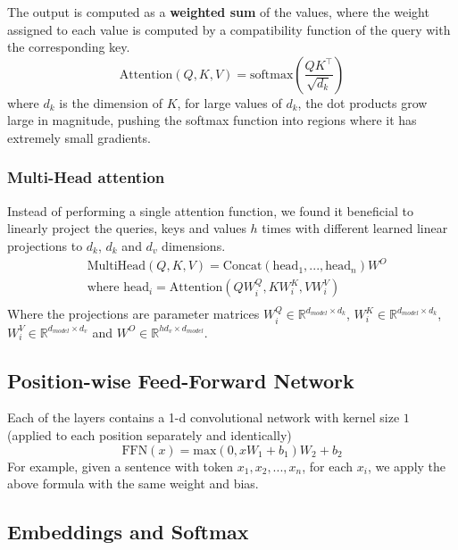 \documentclass[a3paper, 12pt]{book} %
\begin{document}
The output is computed as a \textbf{weighted sum} of the values, where the weight assigned to each value is computed by a compatibility function of the query with the corresponding key.
\begin{equation}
\text{Attention}{(Q,K,V)}= \text{softmax}{(\frac{QK^{\top}}{\sqrt{d_k}})}
\end{equation}
where $d_k$ is the dimension of $K$, for large values of $d_k$, the dot products grow large in magnitude, pushing the softmax function into regions where it has extremely small gradients.
\subsubsection{Multi-Head attention}
Instead of performing a single attention function, we found it beneficial to linearly project the queries, keys and values $h$ times with different learned linear projections to $d_k$, $d_k$ and $d_v$ dimensions.
\begin{equation}
\begin{split}
& \text{MultiHead}(Q,K,V)=\text{Concat}(\text{head}_1, ...,\text{head}_n) W^O \\
& \text{where } \text{head}_i = \text{Attention}(QW_i^Q, KW_i^K, VW_i^V)  \\
\end{split}
\end{equation}
Where the projections are parameter matrices $W_i^Q \in \mathbb{R}^{d_{model}\times d_k}$,  $W_i^K \in \mathbb{R}^{d_{model}\times d_k}$,  $W_i^V \in \mathbb{R}^{d_{model}\times d_v}$ and $W^O \in \mathbb{R}^{hd_v \times d_{model}} $.

\subsection{Position-wise Feed-Forward Network}
Each of the layers contains a 1-d convolutional network with kernel size $1$ (applied to each position separately and identically)
\begin{equation}
\text{FFN}(x) = \text{max}(0, xW_1+b_1)W_2+b_2
\end{equation}
For example, given a sentence with token $x_1, x_2,..., x_n$, for each $x_i$, we apply the above formula with the same weight and bias.

\subsection{Embeddings and Softmax}
\end{document}
